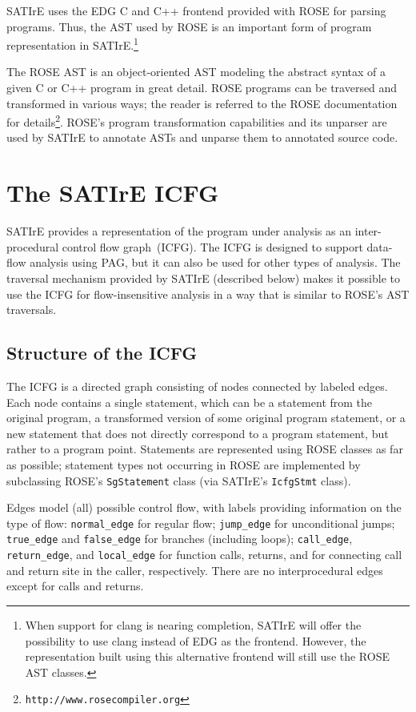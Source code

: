 \documentclass[a4paper,12pt]{report}
\begin{document}
SATIrE uses the EDG C and C++ frontend provided with ROSE for parsing
programs. Thus, the AST used by ROSE is an important form of program
representation in SATIrE.\footnote{When support for clang is nearing
completion, SATIrE will offer the possibility to use clang instead of EDG as
the frontend. However, the representation built using this alternative
frontend will still use the ROSE AST classes.}

The ROSE AST is an object-oriented AST modeling the abstract syntax of a
given C or C++ program in great detail. ROSE programs can be traversed and
transformed in various ways; the reader is referred to the ROSE
documentation for details\footnote{\texttt{http://www.rosecompiler.org}}.
ROSE's program transformation capabilities and its unparser are used by
SATIrE to annotate ASTs and unparse them to annotated source code.

\section{The SATIrE ICFG}
\label{sec:satire_icfg}

SATIrE provides a representation of the program under analysis as an
inter-procedural control flow graph~(ICFG). The ICFG is designed to support
data-flow analysis using PAG, but it can also be used for other types of
analysis. The traversal mechanism provided by SATIrE (described below) makes
it possible to use the ICFG for flow-insensitive analysis in a way that is
similar to ROSE's AST traversals.

\subsection{Structure of the ICFG}
\label{sec:icfg_structure}

The ICFG is a directed graph consisting of nodes connected by labeled edges.
Each node contains a single statement, which can be a statement from the
original program, a transformed version of some original program statement,
or a new statement that does not directly correspond to a program statement,
but rather to a program point. Statements are represented using ROSE classes
as far as possible; statement types not occurring in ROSE are implemented by
subclassing ROSE's \texttt{SgStatement} class (via SATIrE's
\texttt{IcfgStmt} class).

Edges model (all) possible control flow, with labels providing information
on the type of flow: \verb|normal_edge| for regular flow; \verb|jump_edge|
for unconditional jumps; \verb|true_edge| and \verb|false_edge| for branches
(including loops); \verb|call_edge|, \verb|return_edge|, and
\verb|local_edge| for function calls, returns, and for connecting call and
return site in the caller, respectively. There are no interprocedural edges
except for calls and returns.
\end{document}
